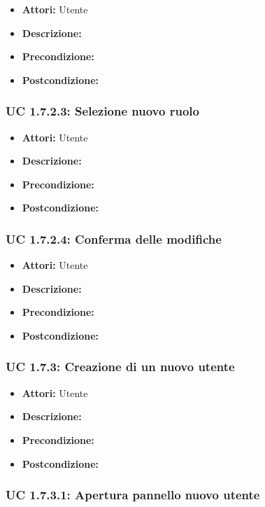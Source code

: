 \begin{itemize}
\item \textbf{Attori:} Utente
\item \textbf{Descrizione:} 
\item \textbf{Precondizione:} 
\item \textbf{Postcondizione:} 
\end{itemize}

\subsubsection{UC 1.7.2.3: Selezione nuovo ruolo}

\begin{itemize}
\item \textbf{Attori:} Utente
\item \textbf{Descrizione:} 
\item \textbf{Precondizione:} 
\item \textbf{Postcondizione:} 
\end{itemize}

\subsubsection{UC 1.7.2.4: Conferma delle modifiche}

\begin{itemize}
\item \textbf{Attori:} Utente
\item \textbf{Descrizione:} 
\item \textbf{Precondizione:} 
\item \textbf{Postcondizione:} 
\end{itemize}

\subsubsection{UC 1.7.3: Creazione di un nuovo utente}

\begin{itemize}
\item \textbf{Attori:} Utente
\item \textbf{Descrizione:} 
\item \textbf{Precondizione:} 
\item \textbf{Postcondizione:} 
\end{itemize}

\subsubsection{UC 1.7.3.1: Apertura pannello nuovo utente}

